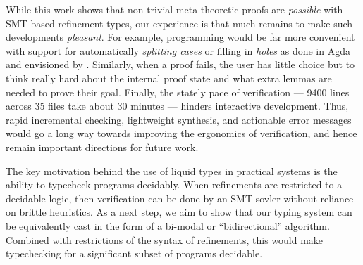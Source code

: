 %
While this work shows that non-trivial
meta-theoretic proofs are \emph{possible}
with SMT-based refinement types, our experience
is that much remains to make such developments
\emph{pleasant}.
%
For example, programming would be far more convenient
with support for automatically \emph{splitting cases}
or filling in \emph{holes} as done in Agda \cite{agda}
and envisioned by \citet{hole_driven_liquid}.
%
Similarly, when a proof fails, the user has little
choice but to think really hard about the internal
proof state and what extra lemmas are needed to prove
their goal.
%
Finally, the stately pace of verification --- 9400 lines
across 35 files take about 30 minutes --- hinders
interactive development.
%
Thus, rapid incremental checking, lightweight synthesis,
and actionable error messages would go a long way towards
improving the ergonomics of verification, and hence remain
important directions for future work.

 The key motivation behind
the use of liquid types in practical systems is the ability to 
typecheck programs decidably.
%
When refinements are restricted to a decidable logic, then 
verification can be done by an SMT sovler
without reliance on brittle heuristics.
%
As a next step, we aim to show that our typing system can be
equivalently cast in the form of a bi-modal or ``bidirectional''
algorithm. 
%
Combined with restrictions of the syntax of refinements, this would 
make typechecking for a significant subset of \sysrfd programs decidable.